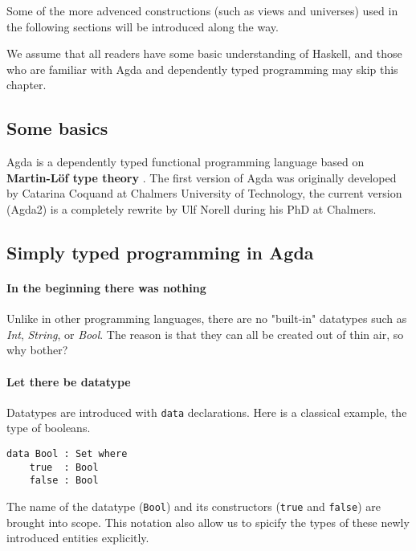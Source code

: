 \documentclass[12pt, a4paper]{article}
\begin{document}
Some of the more advenced constructions (such as views and universes) used in
the following sections will be introduced along the way.

We assume that all readers have some basic understanding of Haskell, and those
who are familiar with Agda and dependently typed programming may skip this chapter.

\subsection{Some basics}
Agda is a dependently typed functional programming language based on \textbf{Martin-Löf type theory} \cite{martin1984intuitionistic}.
The first version of Agda was originally developed by Catarina Coquand at Chalmers University of Technology, the current version (Agda2) is a completely rewrite by Ulf Norell during his PhD at Chalmers.

\subsection{Simply typed programming in Agda}


\paragraph{In the beginning there was nothing}
Unlike in other programming languages, there are no "built-in"
datatypes such as \textit{Int}, \textit{String}, or \textit{Bool}.
The reason is that they can all be created out of thin air, so why bother?

\paragraph{Let there be datatype}
Datatypes are introduced with {\lstinline|data|} declarations. Here is a classical example, the type of booleans.

\begin{lstlisting}
data Bool : Set where
    true  : Bool
    false : Bool
\end{lstlisting}

The name of the datatype ({\lstinline|Bool|}) and its constructors ({\lstinline|true|} and {\lstinline|false|}) are brought into scope.
This notation also allow us to spicify the types of these newly introduced entities explicitly.
\end{document}
